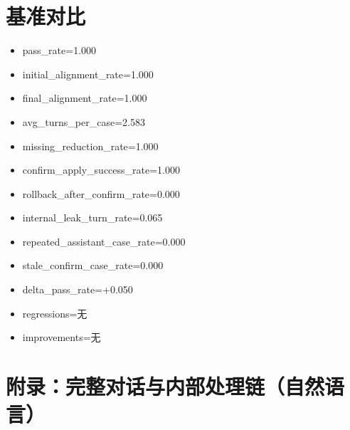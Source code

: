 \documentclass[11pt]{ctexart}
\begin{document}
\section{基准对比}
\begin{itemize}
\item pass\_rate=1.000
\item initial\_alignment\_rate=1.000
\item final\_alignment\_rate=1.000
\item avg\_turns\_per\_case=2.583
\item missing\_reduction\_rate=1.000
\item confirm\_apply\_success\_rate=1.000
\item rollback\_after\_confirm\_rate=0.000
\item internal\_leak\_turn\_rate=0.065
\item repeated\_assistant\_case\_rate=0.000
\item stale\_confirm\_case\_rate=0.000
\item delta\_pass\_rate=+0.050
\item regressions=无
\item improvements=无
\end{itemize}
\appendix
\section{附录：完整对话与内部处理链（自然语言）}
\end{document}
